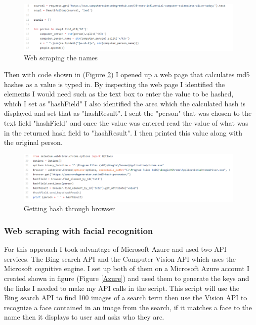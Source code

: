\documentclass[12pt,a4paper]{article}
\begin{document}
\begin{figure}[h]
    \centering
    \includegraphics[width=1.0\textwidth]{Figs/web_scrape1.PNG} 
    \caption{Web scraping the names} 
    \label{Webscrape1}
\end{figure}  

Then with code shown in (Figure \ref{Webscrape2}) I opened up a web page that calculates md5 hashes as a value is typed in. By inspecting the web page I identified the elements I would need such as the text box to enter the value to be hashed, which I set as "hashField" I also identified the area which the calculated hash is displayed and set that as "hashResult". I sent the "person" that was chosen to the text field "hashField" and once the value was entered read the value of what was in the returned hash field to "hashResult". I then printed this value along with the original person.

\begin{figure}[h]
    \centering
    \includegraphics[width=1.0\textwidth]{Figs/web_scrape2.PNG} 
    \caption{Getting hash through browser} 
    \label{Webscrape2}
\end{figure} 



\subsubsection{Web scraping with facial recognition}   

For this approach I took advantage of Microsoft Azure and used two API services. The Bing search API and the Computer Vision API which uses the Microsoft cognitive engine. I set up both of them on a Microsoft Azure account I created shown in figure (Figure \ref{Azure}) and used them to generate the keys and the links I needed to make my API calls in the script. This script will use the Bing search API to find 100 images of a search term then use the Vision API to recognize a face contained in an image from the search, if it matches a face to the name then it displays to user and asks who they are. 
\end{document}
